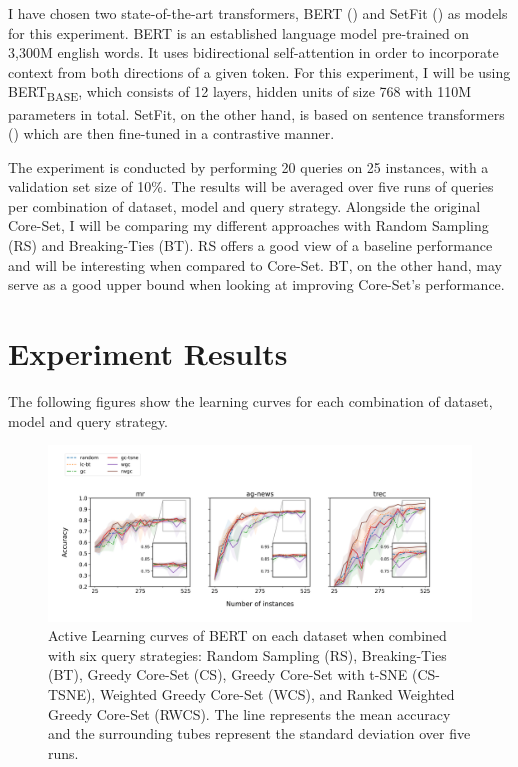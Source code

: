 \documentclass[english,bachelor,ul]{webisthesis} %
\begin{document}
I have chosen two state-of-the-art transformers, BERT (\cite{DBLP:conf/naacl/DevlinCLT19}) and SetFit (\cite{DBLP:setfit}) as models for this experiment. BERT is an established language model pre-trained on 3,300M english words. It uses bidirectional self-attention in order to incorporate context from both directions of a given token. For this experiment, I will be using BERT\textsubscript{BASE}, which consists of 12 layers, hidden units of size 768 with 110M parameters in total. SetFit, on the other hand, is based on sentence transformers (\cite{DBLP:conf/emnlp/ReimersG19}) which are then fine-tuned in a contrastive manner.

The experiment is conducted by performing 20 queries on 25 instances, with a validation set size of 10\%. The results will be averaged over five runs of queries per combination of dataset, model and query strategy. Alongside the original Core-Set, I will be comparing my different approaches with Random Sampling (RS) and Breaking-Ties (BT). RS offers a good view of a baseline performance and will be interesting when compared to Core-Set. BT, on the other hand, may serve as a good upper bound when looking at improving Core-Set's performance. 


\section{Experiment Results}

The following figures show the learning curves for each combination of dataset, model and query strategy. 

\begin{figure}[htbp]
    \centering
    \includegraphics[width=1\textwidth]{img/bert-plots-1.png}
    \caption{Active Learning curves of BERT on each dataset when combined with six query strategies: Random Sampling (RS), Breaking-Ties (BT), Greedy Core-Set (CS), Greedy Core-Set with t-SNE (CS-TSNE), Weighted Greedy Core-Set (WCS), and Ranked Weighted Greedy Core-Set (RWCS). The line represents the mean accuracy and the surrounding tubes represent the standard deviation over five runs.}
    \label{fig:bert-curves}
\end{figure}
\end{document}
